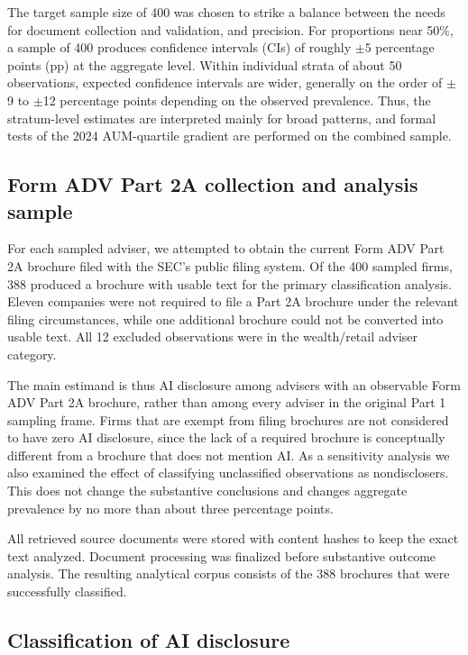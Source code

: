 \documentclass[utf8]{FrontiersinHarvard}
\begin{document}
The target sample size of 400 was chosen to strike a balance between the needs for document collection and validation, and precision. For proportions near 50\%, a sample of 400 produces confidence intervals (CIs) of roughly $\pm 5$ percentage points (pp) at the aggregate level. Within individual strata of about 50 observations, expected confidence intervals are wider, generally on the order of $\pm$9 to $\pm$12 percentage points depending on the observed prevalence. Thus, the stratum-level estimates are interpreted mainly for broad patterns, and formal tests of the 2024 AUM-quartile gradient are performed on the combined sample.

\subsection{Form ADV Part 2A collection and analysis sample}

For each sampled adviser, we attempted to obtain the current Form ADV Part 2A brochure filed with the SEC's public filing system. Of the 400 sampled firms, 388 produced a brochure with usable text for the primary classification analysis. Eleven companies were not required to file a Part 2A brochure under the relevant filing circumstances, while one additional brochure could not be converted into usable text. All 12 excluded observations were in the wealth/retail adviser category.

The main estimand is thus AI disclosure among advisers with an observable Form ADV Part 2A brochure, rather than among every adviser in the original Part 1 sampling frame. Firms that are exempt from filing brochures are not considered to have zero AI disclosure, since the lack of a required brochure is conceptually different from a brochure that does not mention AI. As a sensitivity analysis we also examined the effect of classifying unclassified observations as nondisclosers. This does not change the substantive conclusions and changes aggregate prevalence by no more than about three percentage points.

All retrieved source documents were stored with content hashes to keep the exact text analyzed. Document processing was finalized before substantive outcome analysis. The resulting analytical corpus consists of the 388 brochures that were successfully classified.

\subsection{Classification of AI disclosure}
\end{document}
